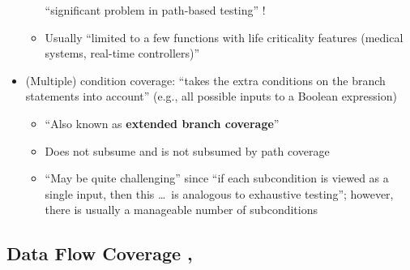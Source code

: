 \begin{itemize}
\begin{itemize}
                    ``significant problem in path-based testing''
                    \citep[p.~5-5]{SWEBOK2024}!
              \item Usually ``limited to a few functions with life
                    criticality features (medical systems, real-time
                    controllers)'' \citep[p.~481]{PetersAndPedrycz2000}
          \end{itemize}
    \item (Multiple) condition coverage: ``takes the extra conditions on the
          branch statements into account'' (e.g., all possible inputs to a
          Boolean expression) \citep[p.~120]{Patton2006}
          \begin{itemize}
              \item ``Also known as \textbf{extended branch coverage}''
                    \citep[p.~422]{vanVliet2000}
              \item Does not subsume and is not subsumed by path coverage
                    \citep[p.~433]{vanVliet2000}
              \item ``May be quite challenging'' since ``if each
                    subcondition is viewed as a single input, then this
                    \dots\ is analogous to exhaustive testing''; however,
                    there is usually a manageable number of subconditions
                    \citep[p.~464]{PetersAndPedrycz2000}
          \end{itemize}
\end{itemize}

\subsection[Data Flow Coverage]{Data Flow Coverage \citep[p.~114]{Patton2006},
    \citep[pp.~424-425]{vanVliet2000}}
\label{data-flow-coverage}

